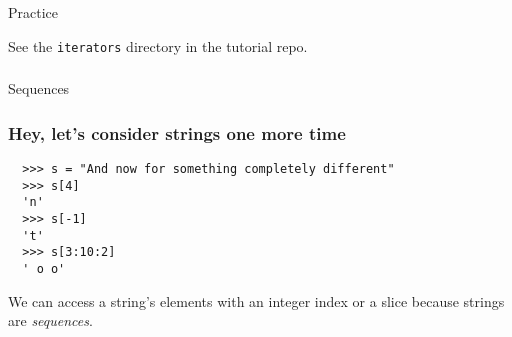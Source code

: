 \documentclass[aspectratio=169]{beamer}
\begin{document}
\begin{frame}
  \frametitle{} 
   
   \centerline{\huge Practice} 
   \centerline{See the \texttt{iterators} directory in the tutorial repo.} 
   
   \end{frame}

\begin{frame}
  \frametitle{} 
  \centerline{\huge Sequences}
 \end{frame}

\begin{frame}[fragile]
  \frametitle{Hey, let's consider strings one more time}
  
  \begin{verbatim}
  >>> s = "And now for something completely different"
  >>> s[4]
  'n'
  >>> s[-1]
  't'
  >>> s[3:10:2]
  ' o o'
  \end{verbatim}
  
  \bigbreak
  We can access a string's elements with an integer index or a slice because strings are \emph{sequences}.
  
  \end{frame}
\end{document}
